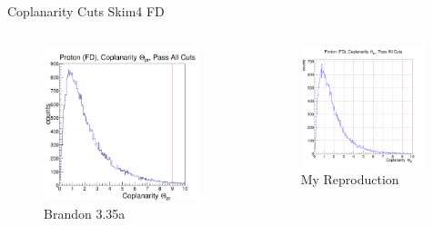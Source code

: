 \documentclass[aspectratio=169]{beamer}
\begin{document}
\begin{frame}{Coplanarity Cuts \hfill Skim4 FD}
\vspace*{-0.6cm}
    \begin{columns}
    \begin{figure}
        \centering
        \includegraphics[width=0.94\textwidth]{brandon_figs/35a.png}
        \caption{Brandon 3.35a}
    \end{figure}
    \begin{figure}
        \centering
        \includegraphics[width=0.97\textwidth]{pdfs/35a.png}
        \caption{My Reproduction}
    \end{figure}
    \end{columns}
\end{frame}
\end{document}
